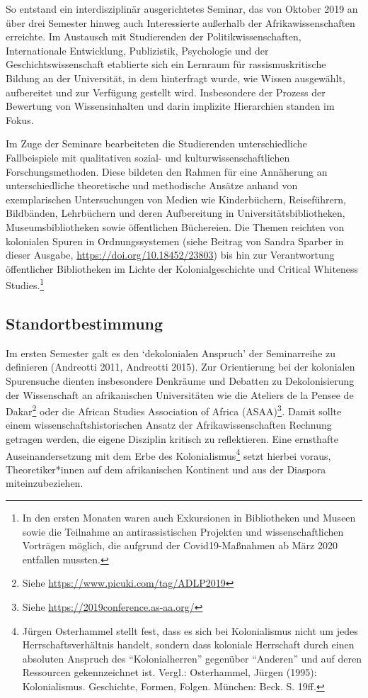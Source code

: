 \documentclass[a4paper,
fontsize=11pt,
oneside,
numbers=noperiodatend,
parskip=half-,
bibliography=totoc,
final
]{scrartcl}
\begin{document}
So entstand ein interdisziplinär ausgerichtetes Seminar, das von Oktober
2019 an über drei Semester hinweg auch Interessierte außerhalb der
Afrikawissenschaften erreichte. Im Austausch mit Studierenden der
Politikwissenschaften, Internationale Entwicklung, Publizistik,
Psychologie und der Geschichtswissenschaft etablierte sich ein Lernraum
für rassismuskritische Bildung an der Universität, in dem hinterfragt
wurde, wie Wissen ausgewählt, aufbereitet und zur Verfügung gestellt
wird. Insbesondere der Prozess der Bewertung von Wissensinhalten und
darin implizite Hierarchien standen im Fokus.

Im Zuge der Seminare bearbeiteten die Studierenden unterschiedliche
Fallbeispiele mit qualitativen sozial- und kulturwissenschaftlichen
Forschungsmethoden. Diese bildeten den Rahmen für eine Annäherung an
unterschiedliche theoretische und methodische Ansätze anhand von
exemplarischen Untersuchungen von Medien wie Kinderbüchern,
Reiseführern, Bildbänden, Lehrbüchern und deren Aufbereitung in
Universitätsbibliotheken, Museumsbibliotheken sowie öffentlichen
Büchereien. Die Themen reichten von kolonialen Spuren in
Ordnungssystemen (siehe Beitrag von Sandra Sparber in dieser Ausgabe,
\url{https://doi.org/10.18452/23803}) bis hin zur Verantwortung
öffentlicher Bibliotheken im Lichte der Kolonialgeschichte und Critical
Whiteness Studies.\footnote{In den ersten Monaten waren auch Exkursionen
  in Bibliotheken und Museen sowie die Teilnahme an antirassistischen
  Projekten und wissenschaftlichen Vorträgen möglich, die aufgrund der
  Covid19-Maßnahmen ab März 2020 entfallen mussten.}

\hypertarget{standortbestimmung}{%
\subsection{Standortbestimmung}\label{standortbestimmung}}

Im ersten Semester galt es den \enquote*{dekolonialen Anspruch} der
Seminarreihe zu definieren (Andreotti 2011, Andreotti 2015). Zur
Orientierung bei der kolonialen Spurensuche dienten insbesondere
Denkräume und Debatten zu Dekolonisierung der Wissenschaft an
afrikanischen Universitäten wie die Ateliers de la Pensee de
Dakar\footnote{Siehe \url{https://www.picuki.com/tag/ADLP2019}} oder die
African Studies Association of Africa (ASAA)\footnote{Siehe
  \url{https://2019conference.as-aa.org/}}\emph{.} Damit sollte einem
wissenschaftshistorischen Ansatz der Afrikawissenschaften Rechnung
getragen werden, die eigene Disziplin kritisch zu reflektieren. Eine
ernsthafte Auseinandersetzung mit dem Erbe des Kolonialismus\footnote{Jürgen
  Osterhammel stellt fest, dass es sich bei Kolonialismus nicht um jedes
  Herrschaftsverhältnis handelt, sondern dass koloniale Herrschaft durch
  einen absoluten Anspruch des \enquote{Kolonialherren} gegenüber
  \enquote{Anderen} und auf deren Ressourcen gekennzeichnet ist. Vergl.:
  Osterhammel, Jürgen (1995): Kolonialismus. Geschichte, Formen, Folgen.
  München: Beck. S. 19ff.} setzt hierbei voraus, Theoretiker*innen auf
dem afrikanischen Kontinent und aus der Diaspora miteinzubeziehen.
\end{document}
